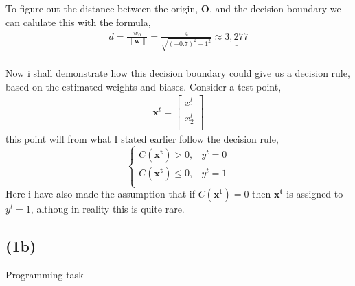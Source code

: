 \documentclass[12pt, letterpaper]{article}
\newcommand{\bs}{\boldsymbol}
\newcommand{\mbf}{\mathbf}
\begin{document}
      \newline
      To figure out the distance between the origin, $\bs{O}$, and the decision boundary we can calulate this with the formula,
      \begin{align*}
        d = \frac{w_0}{\|\bs{w}\|} = \frac{4}{\sqrt{(-0.7)^2 + 1^2}} \approx \underline{\underline{3,277}}
      \end{align*}\\
      Now i shall demonstrate how this decision boundary could give us a decision rule, based on the estimated weights and biases. Consider a test point,
      \begin{align*}
        \mbf{x}^t =
        \begin{bmatrix}
          x_1^t \\
          x_2^t \\
        \end{bmatrix}
      \end{align*}
      this point will from what I stated earlier follow the  decision rule,
      \[
        \begin{cases}
          C(\mbf{x^t}) > 0, & y^t = 0\\
          C(\mbf{x^t}) \leq 0, & y^t = 1\\
        \end{cases}
      \]
      Here i have also made the assumption that if  $C(\mbf{x^t}) = 0$ then $\mbf{x^t}$ is assigned to $y^t = 1$, althoug in reality this is quite rare.

    \subsection*{(1b)}
      Programming task
\end{document}
